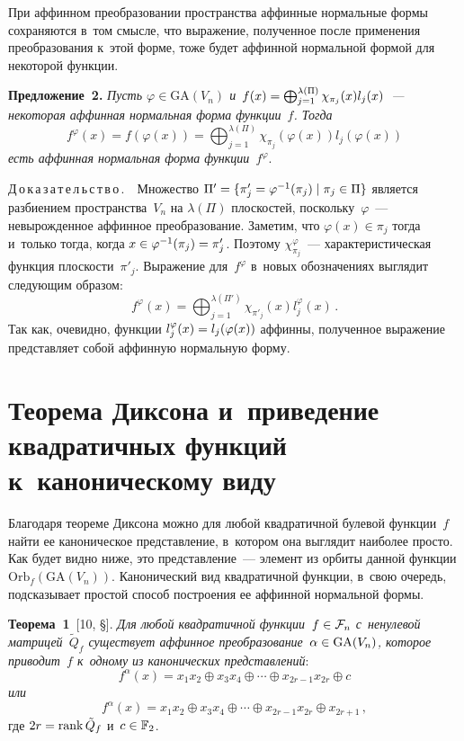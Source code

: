 \begin{multicols}{2}
При аффинном преобразовании пространства аффинные нормальные формы сохраняются 
в~том смысле, что выражение, полученное после применения преобразования к~этой 
форме, тоже будет аффинной нормальной формой для некоторой функции.

\smallskip

\noindent
\textbf{Предложение~2.}
\textit{Пусть $\varphi\in\mathrm{GA}(V_n)$ и~$f(x)\hm=
\bigoplus_{j=1}^{\lambda(\Pi)}\chi_{\pi_j}(x) l_j(x)$~--- некоторая 
аффинная нормальная форма функции~$f$.
  Тогда} 
$$
f^{\varphi}(x)=f(\varphi(x))=\bigoplus_{j=1}^{\lambda(\Pi)}\chi_{\pi_j}(\varphi(x)) 
l_j(\varphi(x))$$ 
\textit{есть аффинная нормальная форма функции~$f^{\varphi}$}.


\smallskip

\noindent
Д\,о\,к\,а\,з\,а\,т\,е\,л\,ь\,с\,т\,в\,о\,.\ \ 
Множество $\Pi'\hm=\{\pi'_j\hm=\varphi^{-1}(\pi_j) \mid \pi_j\in\Pi\}$ является 
разбиением пространства~$V_n$ на $\lambda(\Pi)$ плоскостей, поскольку~$\varphi$~--- 
не\-вы\-рож\-ден\-ное аффинное преобразование.
Заметим,\linebreak
 что $\varphi(x)\in\pi_j$ тогда и~только тогда, когда $x\hm\in\varphi^{-1}
(\pi_j)\hm=\pi'_j$.
Поэтому $\chi^{\varphi}_{\pi_j}$~--- характеристическая функция 
плоскости~$\pi'_j$.
Выражение для~$f^{\varphi}$ в~новых обозначениях выглядит следующим образом:
$$
f^{\varphi}(x)=\bigoplus_{j=1}^{\lambda(\Pi')}\chi_{\pi'_j}(x) l_j^{\varphi}(x)\,.
$$
Так как, очевидно, функции $l_j^{\varphi}(x)\hm=l_j(\varphi(x))$ аффинны, полученное 
выражение представляет собой аффинную нормальную форму.


\section{Теорема Диксона и~приведение квадратичных функций к~каноническому 
виду}\label{Dickson}

Благодаря теореме Диксона можно для любой квадратичной булевой функции~$f$ найти 
ее каноническое представление, в~котором она выглядит наиболее просто. Как будет 
видно ниже, это представление~--- элемент из орбиты данной функции 
$\mathrm{Orb}_f(\mathrm{GA}(V_n))$.
Канонический вид квадратичной функции, в~свою очередь, подсказывает прос\-той 
способ построения ее аффинной нормальной \mbox{формы.}

\smallskip

\noindent
\textbf{Теорема~1}\ [10, \S{}].
\textit{Для любой квад\-ра\-тич\-ной функции~$f\hm\in\mathcal{F}_n$ с~ненулевой 
матрицей~$\tilde{Q}_f$ существует аффинное 
преобразование~$\alpha\hm\in\mathrm{GA}(V_n)$, которое приводит~$f$ к~одному из  
канонических представлений}:
$$f^{\alpha}(x)=x_1x_2\oplus x_3x_4\oplus\cdots\oplus x_{2r-1}x_{2r}\oplus c
$$
\textit{или}
$$f^{\alpha}(x)=x_1x_2\oplus x_3x_4\oplus\cdots\oplus x_{2r-1}x_{2r}\oplus 
x_{2r+1}\,,
$$
где $2r=\mathrm{rank}\, \tilde{Q}_f$ и~$c\hm\in\mathbb{F}_2$.


\end{multicols}
